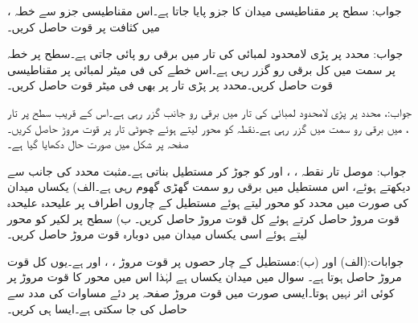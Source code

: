 جواب:
سطح  پر مقناطیسی میدان کا  جزو  پایا جاتا ہے۔اس مقناطیسی جزو سے خطہ ،  میں کثافت  پر قوت حاصل کریں۔

جواب:
 محدد پر پڑی لامحدود لمبائی کی تار میں  برقی رو پائی جاتی ہے۔سطح  پر خطہ  پر  سمت میں کل  برقی رو گزر رہی ہے۔اس خطے کی فی میٹر لمبائی پر مقناطیسی قوت حاصل کریں۔محدد  پر پڑی تار پر بھی فی میٹر قوت حاصل کریں۔

جواب:، 
محدد  پر پڑی لامحدود لمبائی کی تار میں  برقی رو  جانب گزر رہی ہے۔اس کے قریب سطح  پر تار ،  میں  برقی رو  سمت میں گزر رہی ہے۔نقطہ  کو محور لیتے ہوئے چھوٹی تار پر قوت مروڑ حاصل کریں۔صفحہ  پر شکل  میں صورت حال دکھایا گیا ہے۔

جواب:
موصل تار نقطہ ، ،  اور  کو جوڑ کر مستطیل بناتی ہے۔مثبت  محدد کی جانب سے دیکھتے ہوئے، اس مستطیل میں  برقی رو سمت گھڑی گھوم رہی ہے۔الف)  یکساں میدان  کی صورت میں  محدد  کو محور لیتے ہوئے مستطیل کے چاروں اطراف پر علیحدہ علیحدہ  قوت مروڑ حاصل کرتے ہوئے کل قوت مروڑ حاصل کریں۔ ب) سطح  پر لکیر  کو محور لیتے ہوئے اسی یکساں میدان میں دوبارہ قوت مروڑ حاصل کریں۔

جوابات:(الف) اور (ب):مستطیل کے چار حصوں پر قوت مروڑ ، ،  اور  ہے۔یوں کل قوت مروڑ  حاصل ہوتا ہے۔
سوال  میں میدان یکساں ہے لہٰذا اس میں محور کا قوت مروڑ پر کوئی اثر نہیں ہوتا۔ایسی صورت میں قوت مروڑ صفحہ  پر دئے  مساوات  کی مدد سے حاصل کی جا سکتی ہے۔ایسا ہی کریں۔

